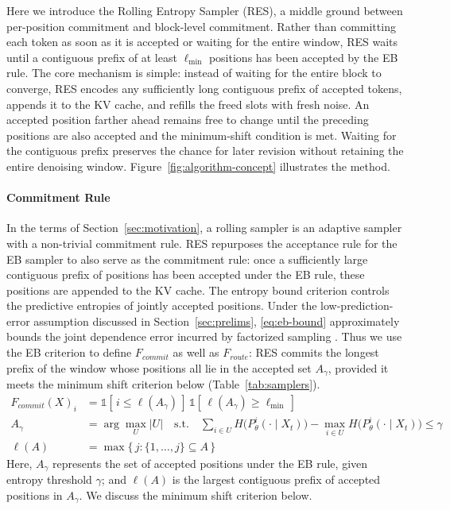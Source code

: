 Here we introduce the Rolling Entropy Sampler (RES), a middle ground between per-position commitment and block-level commitment. Rather than committing each token as soon as it is accepted or waiting for the entire window, RES waits until a contiguous prefix of at least $\ell_{\min}$ positions has been accepted by the EB rule.
The core mechanism is simple: instead of waiting for the entire block to converge, RES encodes any sufficiently long contiguous prefix of accepted tokens, appends it to the KV cache, and refills the freed slots with fresh noise.
An accepted position farther ahead remains free to change until the preceding positions are also accepted and the minimum-shift condition is met. Waiting for the contiguous prefix preserves the chance for later revision without retaining the entire denoising window.
Figure~\ref{fig:algorithm-concept} illustrates the method.


\paragraph{Commitment Rule}
In the terms of Section~\ref{sec:motivation}, a rolling sampler is an adaptive sampler with a non-trivial commitment rule.
RES repurposes the acceptance rule for the EB sampler to also serve as the commitment rule: once a sufficiently large contiguous prefix of positions has been accepted under the EB rule, these positions are appended to the KV cache. 
The entropy bound criterion controls the predictive entropies of jointly accepted positions. Under the low-prediction-error assumption discussed in Section~\ref{sec:prelims}, \eqref{eq:eb-bound} approximately bounds the joint dependence error incurred by factorized sampling \citep{ben2026accelerated}.
Thus we use the EB criterion to define $F_{commit}$ as well as $F_{route}$: RES commits the longest prefix of the window whose positions all lie in the accepted set $A_{\gamma}$, provided it meets the minimum shift criterion below (Table~\ref{tab:samplers}).
\begin{align*}
    F_{commit}(X)_i &= \mathbb{1}\!\left[\, i \le \ell(A_\gamma) \,\right] \, \mathbb{1}\!\left[\, \ell(A_\gamma) \ge \ell_{\min} \,\right] \\
    A_\gamma &= \arg\max_{U} |U| \quad \text{s.t.} \quad
    \sum_{i \in U} H\big(P_\theta^i(\cdot \mid X_t)\big) - \max_{i \in U} H\big(P_\theta^i(\cdot \mid X_t)\big) \le \gamma \\
    \ell(A) &= \max \{\, j : \{1, \dots, j\} \subseteq A \,\}
\end{align*}
Here, $A_{\gamma}$ represents the set of accepted positions under the EB rule, given entropy threshold $\gamma$; and $\ell(A)$ is the largest contiguous prefix of accepted positions in $A_{\gamma}$. 
We discuss the minimum shift criterion below. 

